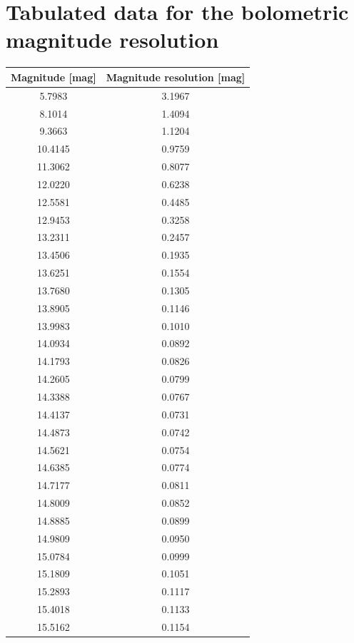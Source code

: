 \documentclass[fleqn,usenatbib]{mnras}
\begin{document}
\section{Tabulated data for the bolometric magnitude resolution}
\label{appexdix:magnitude-resolution}
\begin{table}
    \centering
    \begin{tabular}{c|c}
        Magnitude [mag] & Magnitude resolution [mag] \\\hline\hline
        5.7983 & 3.1967\\
        8.1014 & 1.4094\\
        9.3663 & 1.1204\\
        10.4145 & 0.9759\\
        11.3062 & 0.8077\\\hline
        12.0220 & 0.6238\\
        12.5581 & 0.4485\\
        12.9453 & 0.3258\\
        13.2311 & 0.2457\\
        13.4506 & 0.1935\\\hline
        13.6251 & 0.1554\\
        13.7680 & 0.1305\\
        13.8905 & 0.1146\\
        13.9983 & 0.1010\\
        14.0934 & 0.0892\\\hline
        14.1793 & 0.0826\\
        14.2605 & 0.0799\\
        14.3388 & 0.0767\\
        14.4137 & 0.0731\\
        14.4873 & 0.0742\\\hline
        14.5621 & 0.0754\\
        14.6385 & 0.0774\\
        14.7177 & 0.0811\\
        14.8009 & 0.0852\\
        14.8885 & 0.0899\\\hline
        14.9809 & 0.0950\\
        15.0784 & 0.0999\\
        15.1809 & 0.1051\\
        15.2893 & 0.1117\\
        15.4018 & 0.1133\\\hline
        15.5162 & 0.1154\\

\end{tabular}
\end{table}
\end{document}
